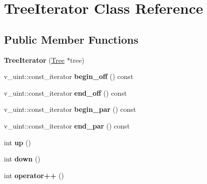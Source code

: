 \hypertarget{classTreeIterator}{}\section{Tree\+Iterator Class Reference}
\label{classTreeIterator}
\subsection*{Public Member Functions}
\begin{DoxyCompactItemize}
\item 
{\bfseries Tree\+Iterator} (\hyperlink{classTree}{Tree} $\ast$tree)\hypertarget{classTreeIterator_a743f2a767abbac4da1fcc5b4029b94f2}{}\label{classTreeIterator_a743f2a767abbac4da1fcc5b4029b94f2}

\item 
v\+\_\+uint\+::const\+\_\+iterator {\bfseries begin\+\_\+off} () const \hypertarget{classTreeIterator_a5489e283acdd398f614a25d14448a8f3}{}\label{classTreeIterator_a5489e283acdd398f614a25d14448a8f3}

\item 
v\+\_\+uint\+::const\+\_\+iterator {\bfseries end\+\_\+off} () const \hypertarget{classTreeIterator_a9f9df3d3c75c8d16f5d1768a6675a41d}{}\label{classTreeIterator_a9f9df3d3c75c8d16f5d1768a6675a41d}

\item 
v\+\_\+uint\+::const\+\_\+iterator {\bfseries begin\+\_\+par} () const \hypertarget{classTreeIterator_a3cb8dd28630f065472e135f7db822abf}{}\label{classTreeIterator_a3cb8dd28630f065472e135f7db822abf}

\item 
v\+\_\+uint\+::const\+\_\+iterator {\bfseries end\+\_\+par} () const \hypertarget{classTreeIterator_aac5656fc5b550cb8dfa4a9ebd5ea910a}{}\label{classTreeIterator_aac5656fc5b550cb8dfa4a9ebd5ea910a}

\item 
int {\bfseries up} ()\hypertarget{classTreeIterator_adca1d999f093a69e2f5d044b358e5da7}{}\label{classTreeIterator_adca1d999f093a69e2f5d044b358e5da7}

\item 
int {\bfseries down} ()\hypertarget{classTreeIterator_a8534adba213df8f7f1e67bf5005d902e}{}\label{classTreeIterator_a8534adba213df8f7f1e67bf5005d902e}

\item 
int {\bfseries operator++} ()\hypertarget{classTreeIterator_aed2ad905c7c0cef8c2fd8e012c67dc5c}{}\label{classTreeIterator_aed2ad905c7c0cef8c2fd8e012c67dc5c}


\end{DoxyCompactItemize}
